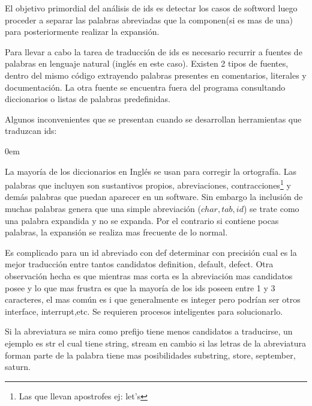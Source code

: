 \documentclass[12pt]{report}
\begin{document}
\begin{framed}
\noindent El objetivo primordial del análisis de ids es detectar los casos de softword luego proceder a separar las palabras abreviadas que la componen(si es mas de una) para posteriormente realizar la expansión\cite{FBL06,LFBEX07}.  
\end{framed}

Para llevar a cabo la tarea de traducción de ids es necesario recurrir a fuentes de palabras en lenguaje natural (inglés en este caso). Existen 2 tipos de fuentes, dentro del mismo código extrayendo palabras presentes en comentarios, literales y documentación. La otra fuente se encuentra fuera del programa consultando diccionarios o listas de palabras predefinidas.


Algunos inconvenientes que se presentan cuando se desarrollan herramientas que traduzcan ids:

\begin{description}
\itemsep0em%
\item[Dificultad para armar diccionarios apropiados:]  La mayoría de los diccionarios en Inglés se usan para corregir la ortografía. Las palabras que incluyen son sustantivos propios, abreviaciones, contracciones\footnote[1]{Las que llevan apostrofes ej: let's} y demás palabras que puedan aparecer en un software. Sin embargo la inclusión de muchas palabras genera que una simple abreviación ($char,tab,id$) se trate como una palabra expandida y no se expanda. Por el contrario si contiene pocas palabras, la expansión se realiza mas frecuente de lo normal.

\item[Las abreviaciones poseen muchos candidatos a expandir:] Es complicado para un id abreviado con \textsf{def} determinar con precisión cual es la mejor traducción entre tantos candidatos \textsf{definition, default, defect}. Otra observación hecha es que mientras mas corta es la abreviación mas candidatos posee y lo que mas frustra es que la mayoría de los ids poseen entre 1 y 3 caracteres, el mas común es \textsf{i} que generalmente es \textsf{integer} pero podrían ser otros \textsf{interface, interrupt},etc. Se requieren procesos inteligentes para solucionarlo.

\item[El tipo de la abreviación afecta el numero de candidatos:] Si la abreviatura se mira como prefijo tiene menos candidatos a traducirse, un ejemplo es \textsf{str} el cual tiene \textsf{string, stream} en cambio si las letras de la abreviatura forman parte de la palabra tiene mas posibilidades \textsf{substring, store, september, saturn}.
\end{description}
\end{document}
